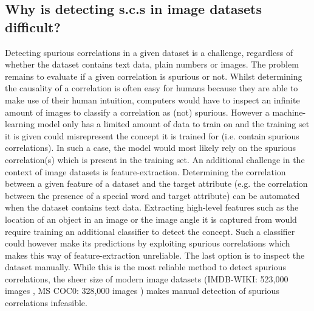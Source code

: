 \documentclass{article}
\begin{document}
\subsection{Why is detecting s.c.s in image datasets difficult?}
\label{sec:challenges}
Detecting spurious correlations in a given dataset is a challenge, regardless of whether the dataset contains
text data, plain numbers or images. The problem remains to evaluate if a given correlation is spurious or not.
Whilst determining the causality of a correlation is often easy for humans because they are able to make use of
their human intuition, computers would have to inspect an infinite amount of images to classify a correlation as
(not) spurious. However a machine-learning model only has a limited amount of data to train on and the training
set it is given could misrepresent the concept it is trained for (i.e. contain spurious correlations). 
In such a case, the model would most likely rely on the spurious correlation(s) which is present in the training set.
An additional challenge in the context of image datasets is feature-extraction. Determining the correlation
between a given feature of a dataset and the target attribute (e.g. the correlation between the presence of a special word
and target attribute) can be automated when the dataset contains text data. Extracting high-level features such as
the location of an object in an image or the image angle it is captured from would require training
an additional classifier to detect the concept. Such a classifier could however make its predictions by exploiting spurious
correlations which makes this way of feature-extraction unreliable.
The last option is to inspect the dataset manually. While this is the most reliable method to detect spurious correlations, the sheer size of modern image datasets (IMDB-WIKI: 523,000 images \cite{Rothe-ICCVW-2015}, MS COC0: 328,000 images \cite{lin2015microsoft}) makes manual detection of spurious correlations infeasible.
\end{document}
